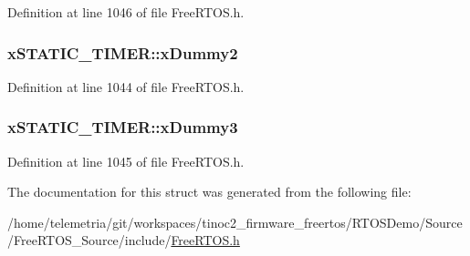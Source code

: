 Definition at line 1046 of file Free\+R\+T\+O\+S.\+h.

\subsubsection[{\texorpdfstring{x\+Dummy2}{xDummy2}}]{ x\+S\+T\+A\+T\+I\+C\+\_\+\+T\+I\+M\+E\+R\+::x\+Dummy2}\hypertarget{structx_s_t_a_t_i_c___t_i_m_e_r_a622e2e596e5829c9197bb44b9009474f}{}\label{structx_s_t_a_t_i_c___t_i_m_e_r_a622e2e596e5829c9197bb44b9009474f}


Definition at line 1044 of file Free\+R\+T\+O\+S.\+h.

\subsubsection[{\texorpdfstring{x\+Dummy3}{xDummy3}}]{ x\+S\+T\+A\+T\+I\+C\+\_\+\+T\+I\+M\+E\+R\+::x\+Dummy3}\hypertarget{structx_s_t_a_t_i_c___t_i_m_e_r_a60d582d1d0b5b9b15e8050d5ae29bc30}{}\label{structx_s_t_a_t_i_c___t_i_m_e_r_a60d582d1d0b5b9b15e8050d5ae29bc30}


Definition at line 1045 of file Free\+R\+T\+O\+S.\+h.



The documentation for this struct was generated from the following file\+:\begin{DoxyCompactItemize}
\item 
/home/telemetria/git/workspaces/tinoc2\+\_\+firmware\+\_\+freertos/\+R\+T\+O\+S\+Demo/\+Source/\+Free\+R\+T\+O\+S\+\_\+\+Source/include/\hyperlink{_free_r_t_o_s_8h}{Free\+R\+T\+O\+S.\+h}\end{DoxyCompactItemize}
